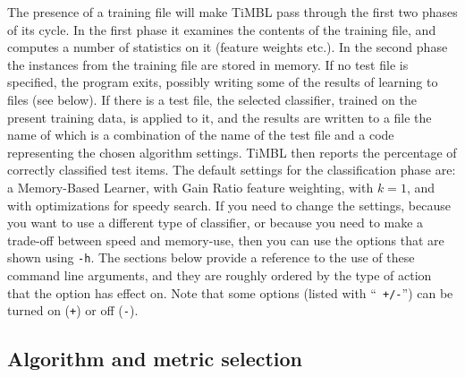 \documentclass{book}
\begin{document}
The presence of a training file will make TiMBL pass through the first
two phases of its cycle. In the first phase it examines the contents
of the training file, and computes a number of statistics on it
(feature weights etc.). In the second phase the instances from the
training file are stored in memory. If no test file is specified, the
program exits, possibly writing some of the results of learning to
files (see below). If there is a test file, the selected classifier,
trained on the present training data, is applied to it, and the
results are written to a file the name of which is a combination of
the name of the test file and a code representing the chosen algorithm
settings. TiMBL then reports the percentage of correctly classified
test items. The default settings for the classification phase are: a
Memory-Based Learner, with Gain Ratio feature weighting, with $k=1$,
and with optimizations for speedy search. If you need to change the
settings, because you want to use a different type of classifier, or
because you need to make a trade-off between speed and memory-use,
then you can use the options that are shown using {\tt -h}. The
sections below provide a reference to the use of these command line
arguments, and they are roughly ordered by the type of action that the
option has effect on. Note that some options (listed with ``{\tt
  +/-}'') can be turned on ({\tt +}) or off ({\tt -}).

\subsection{Algorithm and metric selection}
\end{document}
